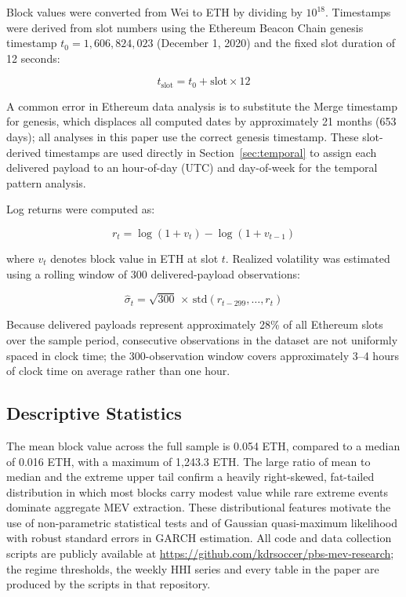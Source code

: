 \documentclass[11pt]{article}
\begin{document}
Block values were converted from Wei to ETH by dividing by $10^{18}$.
Timestamps were derived from slot numbers using the Ethereum Beacon Chain
genesis timestamp $t_0 = 1{,}606{,}824{,}023$ (December 1, 2020) and the fixed
slot duration of 12 seconds:

\begin{equation}
t_{\text{slot}} = t_0 + \text{slot} \times 12
\label{eq:timestamp}
\end{equation}

A common error in Ethereum data analysis is to substitute the Merge timestamp
for genesis, which displaces all computed dates by approximately 21 months (653 days); all
analyses in this paper use the correct genesis timestamp. These slot-derived
timestamps are used directly in Section~\ref{sec:temporal} to assign each delivered payload to
an hour-of-day (UTC) and day-of-week for the temporal pattern analysis.

Log returns were computed as:

\begin{equation}
r_t = \log(1 + v_t) - \log(1 + v_{t-1})
\label{eq:logreturn}
\end{equation}

where $v_t$ denotes block value in ETH at slot $t$. Realized volatility was
estimated using a rolling window of 300 delivered-payload observations:

\begin{equation}
\hat\sigma_t = \sqrt{300} \,\times\, \mathrm{std}(r_{t-299}, \ldots, r_t)
\label{eq:realizedvol}
\end{equation}

Because delivered payloads represent approximately 28\% of all Ethereum slots
over the sample period, consecutive observations in the dataset are not
uniformly spaced in clock time; the 300-observation window covers approximately
3--4 hours of clock time on average rather than one hour.

\subsection{Descriptive Statistics}

The mean block value across the full sample is 0.054 ETH, compared to a median
of 0.016 ETH, with a maximum of 1,243.3 ETH. The large ratio of mean to median
and the extreme upper tail confirm a heavily right-skewed, fat-tailed
distribution in which most blocks carry modest value while rare extreme events
dominate aggregate MEV extraction. These distributional features motivate the
use of non-parametric statistical tests and of Gaussian quasi-maximum
likelihood with robust standard errors in GARCH estimation. All code and data collection scripts are publicly available
at \url{https://github.com/kdrsoccer/pbs-mev-research}; the regime
thresholds, the weekly HHI series and every table in the paper are produced
by the scripts in that repository.
\end{document}
